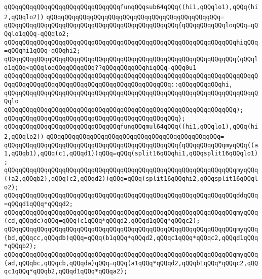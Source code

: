 \newline
\verb|qQQqqQQqqQQqqQQqqQQqqQQqqQQqqQQqfunqQQqsub64qQQq((hi1,qQQqlo1),qQQq(hi2,qQQqlo2))|\newline
\verb|qQQqqQQqqQQqqQQqqQQqqQQqqQQqqQQqqQQqqQQqqQQqqQQq=|\newline
\verb|qQQqqQQqqQQqqQQqqQQqqQQqqQQqqQQqqQQqqQQqqQQqqQQq{qQQqqQQqqQQqloqQQq=qQQqlo1qQQq-qQQqlo2;|\newline
\verb|qQQqqQQqqQQqqQQqqQQqqQQqqQQqqQQqqQQqqQQqqQQqqQQqqQQqqQQqqQQqqQQqhiqQQq=qQQqhi1qQQq-qQQqhi2;|\newline
\newline
\verb|qQQqqQQqqQQqqQQqqQQqqQQqqQQqqQQqqQQqqQQqqQQqqQQqqQQqqQQqqQQqqQQq(qQQqlo1qQQq<qQQqloqQQqqQQqqQQq??qQQqqQQqqQQqhiqQQq-qQQq0u1|\newline
\verb|qQQqqQQqqQQqqQQqqQQqqQQqqQQqqQQqqQQqqQQqqQQqqQQqqQQqqQQqqQQqqQQqqQQqqQQqqQQqqQQqqQQqqQQqqQQqqQQqqQQqqQQqqQQqqQQqqQQq::qQQqqQQqqQQqhi,|\newline
\verb|qQQqqQQqqQQqqQQqqQQqqQQqqQQqqQQqqQQqqQQqqQQqqQQqqQQqqQQqqQQqqQQqqQQqqQQqlo|\newline
\verb|qQQqqQQqqQQqqQQqqQQqqQQqqQQqqQQqqQQqqQQqqQQqqQQqqQQqqQQqqQQqqQQq);|\newline
\verb|qQQqqQQqqQQqqQQqqQQqqQQqqQQqqQQqqQQqqQQqqQQqqQQq};|\newline
\newline
\verb|qQQqqQQqqQQqqQQqqQQqqQQqqQQqqQQqfunqQQqmul64qQQq((hi1,qQQqlo1),qQQq(hi2,qQQqlo2))|\newline
\verb|qQQqqQQqqQQqqQQqqQQqqQQqqQQqqQQqqQQqqQQqqQQqqQQq=|\newline
\verb|qQQqqQQqqQQqqQQqqQQqqQQqqQQqqQQqqQQqqQQqqQQqqQQq{qQQqqQQqqQQqmyqQQq((a1,qQQqb1),qQQq(c1,qQQqd1))qQQq=qQQq(split16qQQqhi1,qQQqsplit16qQQqlo1);|\newline
\verb|qQQqqQQqqQQqqQQqqQQqqQQqqQQqqQQqqQQqqQQqqQQqqQQqqQQqqQQqqQQqqQQqmyqQQq((a2,qQQqb2),qQQq(c2,qQQqd2))qQQq=qQQq(split16qQQqhi2,qQQqsplit16qQQqlo2);|\newline
\verb|qQQqqQQqqQQqqQQqqQQqqQQqqQQqqQQqqQQqqQQqqQQqqQQqqQQqqQQqqQQqqQQqddqQQq=qQQqd1qQQq*qQQqd2;|\newline
\verb|qQQqqQQqqQQqqQQqqQQqqQQqqQQqqQQqqQQqqQQqqQQqqQQqqQQqqQQqqQQqqQQqmyqQQq(cd,qQQqdc)qQQq=qQQq(c1qQQq*qQQqd2,qQQqd1qQQq*qQQqc2);|\newline
\verb|qQQqqQQqqQQqqQQqqQQqqQQqqQQqqQQqqQQqqQQqqQQqqQQqqQQqqQQqqQQqqQQqmyqQQq(bd,qQQqcc,qQQqdb)qQQq=qQQq(b1qQQq*qQQqd2,qQQqc1qQQq*qQQqc2,qQQqd1qQQq*qQQqb2);|\newline
\verb|qQQqqQQqqQQqqQQqqQQqqQQqqQQqqQQqqQQqqQQqqQQqqQQqqQQqqQQqqQQqqQQqmyqQQq(ad,qQQqbc,qQQqcb,qQQqda)qQQq=qQQq(a1qQQq*qQQqd2,qQQqb1qQQq*qQQqc2,qQQqc1qQQq*qQQqb2,qQQqd1qQQq*qQQqa2);|\newline
